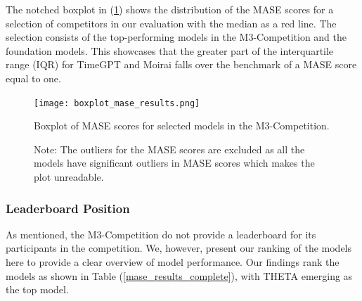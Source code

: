\documentclass[12pt,a4paper]{article}
\begin{document}
The notched boxplot in (\ref{boxplot_mase_scores}) shows the distribution of the MASE scores for a selection of competitors in our evaluation with the median as a red line. The selection consists of the top-performing models in the M3-Competition and the foundation models. This showcases that the greater part of the interquartile range (IQR) for TimeGPT and Moirai falls over the benchmark of a MASE score equal to one.

\begin{figure}[htbp]
  \centering
  \texttt{[image: boxplot\_mase\_results.png]}
  \caption{Boxplot of MASE scores for selected models in the M3-Competition.}
  \label{boxplot_mase_scores}
  \caption*{Note: The outliers for the MASE scores are excluded as all the models have significant outliers in MASE scores which makes the plot unreadable.}
\end{figure}

\subsubsection{Leaderboard Position}

As mentioned, the M3-Competition do not provide a leaderboard for its participants in the competition. We, however, present our ranking of the models here to provide a clear overview of model performance. Our findings rank the models as shown in Table (\ref{mase_results_complete}), with THETA emerging as the top model.
\end{document}
